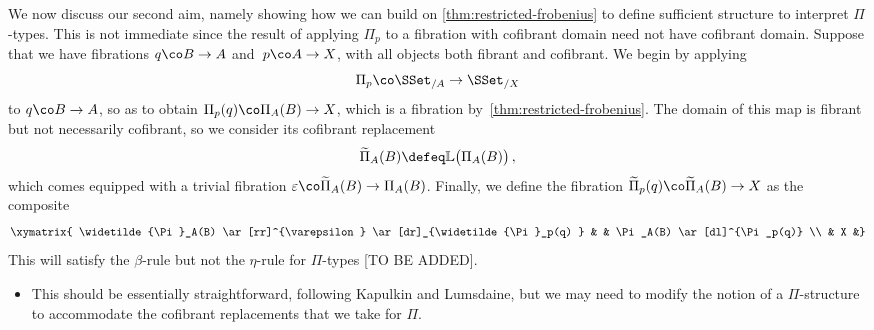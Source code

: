 We now discuss our second aim, namely showing how we can build on \cref{thm:restricted-frobenius} 
to define sufficient structure to interpret $\Pi$-types. This is not immediate since the result of applying $\Pi_p$ to a 
fibration with cofibrant domain need not have cofibrant domain.
 Suppose that we have fibrations 
$q \co B \to A$ and~$p \co A \to X$, with
all objects both fibrant and cofibrant. 
We begin by applying 
\[
\Pi_p  \co \SSet_{/A} \to \SSet_{/X}
\]
to $q \co B \to A$, so as to obtain $\Pi_p(q) \co \Pi_A(B) \to X$, which is
a fibration by~\cref{thm:restricted-frobenius}. The domain of this map is fibrant but
not necessarily cofibrant, so we consider its cofibrant replacement 
\[
\widetilde{\Pi}_A(B) \defeq \mathbb{L} \big( \Pi_A(B)  \big) \, ,
\]
which comes equipped with a trivial fibration $\varepsilon \co \widetilde{\Pi}_A(B) \to \Pi_A(B)$.
Finally, we define the fibration $\widetilde{\Pi}_p(q) \co \widetilde{\Pi}_A(B) \to X$ as 
 the composite
 \[
\xymatrix{
\widetilde{\Pi}_A(B) \ar[rr]^{\varepsilon} \ar[dr]_{\widetilde{\Pi}_p(q) } & & \Pi_A(B) \ar[dl]^{\Pi_p(q)}  \\
 & X &} 
 \]
This will satisfy the $\beta$-rule but not the $\eta$-rule for $\Pi$-types [TO BE ADDED].




\begin{itemize}
\item This should be essentially straightforward, following Kapulkin and Lumsdaine, but we may need to modify the notion of a $\Pi$-structure to accommodate the cofibrant replacements that we take for $\Pi$.
\end{itemize}



